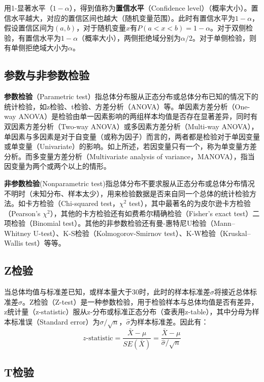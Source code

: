 \documentclass[11pt]{article}
\begin{document}
用1-显著水平（$1-\alpha$），得到值称为\textbf{置信水平}（Confidence level）（概率大小）。置信水平越大，对应的置信区间也越大（随机变量范围）。此时有置信水平为$1-\alpha$，假设置信区间为$(a,b)$，对于随机变量$x$有$P(a<x<b)=1-\alpha$。对于双侧检验，有置信水平为$1-\alpha$（概率大小），两侧拒绝域分别为$\alpha/2$。对于单侧检验，则有单侧拒绝域大小为$\alpha$。

\subsection{参数与非参数检验}

\textbf{参数检验}（Parametric test）指总体分布服从正态分布或总体分布已知的情况下的统计检验，如z检验、t检验、方差分析（ANOVA）等。单因素方差分析（One-way ANOVA）是检验由单一因素影响的两组样本均值是否存在显著差异，同时有双因素方差分析（Two-way ANOVA）或多因素方差分析（Multi-way ANOVA），单因素与多因素是对于自变量（或称为因子）而言的，两者都是检验对于单因变量或单变量（Univariate）的影响。如上所述，若因变量只有一个，称为单变量方差分析。而多变量方差分析（Multivariate analysis of variance，MANOVA），指当因变量为两个或两个以上的情形。

\textbf{非参数检验}(Nonparametric test)指总体分布不要求服从正态分布或总体分布情况不明时（未知分布、样本太少），用来检验数据是否来自同一个总体的统计检验方法。如卡方检验（Chi-squared test，$\chi^2$ test），其中最著名的为皮尔逊卡方检验（Pearson's $\chi^2$），其他的卡方检验还有如费希尔精确检验（Fisher's exact test）二项检验（Binomial test）。其他的非参数检验还有曼-惠特尼U检验（Mann–Whitney U-test）、K-S检验（Kolmogorov-Smirnov test）、K-W检验（Kruskal–Wallis test）等等。

\subsection{Z检验}

当总体均值与标准差已知，或样本量大于30时，此时的样本标准差$\hat{\sigma}$将接近总体标准差$\sigma$。Z检验（Z-test）是一种参数检验，用于检验样本与总体均值是否有差异，z统计量（z-statistic）服从z-分布或标准正态分布（查表用z-table），其中分母为样本标准误（Standard error）为$\sigma/\sqrt{n}$，$\hat{\sigma}$为样本标准差。因此有：
\begin{equation*}
    z\text{-statistic} = \frac{\bar{X}-\mu}{SE(\bar{X})} = \frac{\bar{X} - \mu}{\hat{\sigma}/\sqrt{n}}
\end{equation*}

\subsection{T检验}
\end{document}

